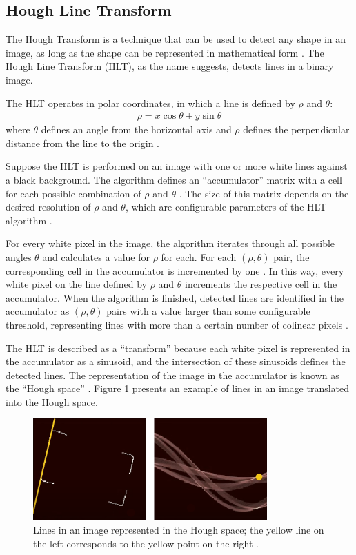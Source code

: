 \subsection{Hough Line Transform}

The Hough Transform is a technique that can be used to detect any shape in an image, as long as the shape can be represented in mathematical form \cite{opencv_hlt}. The Hough Line Transform (HLT), as the name suggests, detects lines in a binary image.

The HLT operates in polar coordinates, in which a line is defined by $\rho$ and $\theta$:
\begin{align}
  \rho = x \cos\theta + y \sin\theta
\end{align}
where $\theta$ defines an angle from the horizontal axis and $\rho$ defines the perpendicular distance from the line to the origin \cite{opencv_hlt}.

Suppose the HLT is performed on an image with one or more white lines against a black background. The algorithm defines an ``accumulator'' matrix with a cell for each possible combination of $\rho$ and $\theta$ \cite{opencv_hlt}. The size of this matrix depends on the desired resolution of $\rho$ and $\theta$, which are configurable parameters of the HLT algorithm \cite{opencv_hlt}.

For every white pixel in the image, the algorithm iterates through all possible angles $\theta$ and calculates a value for $\rho$ for each. For each $(\rho,\theta)$ pair, the corresponding cell in the accumulator is incremented by one \cite{opencv_hlt}. In this way, every white pixel on the line defined by $\rho$ and $\theta$ increments the respective cell in the accumulator. When the algorithm is finished, detected lines are identified in the accumulator as $(\rho,\theta)$ pairs with a value larger than some configurable threshold, representing lines with more than a certain number of colinear pixels \cite{opencv_hlt}.

The HLT is described as a ``transform'' because each white pixel is represented in the accumulator as a sinusoid, and the intersection of these sinusoids defines the detected lines. The representation of the image in the accumulator is known as the ``Hough space'' \cite{opencv_hlt}. Figure \ref{fig:hough_line} presents an example of lines in an image translated into the Hough space.

\begin{figure}[ht]
  \centering
  \includegraphics[width=0.8\textwidth]{images/hough_transform.png}
  \caption{Lines in an image represented in the Hough space; the yellow line on the left corresponds to the yellow point on the right \cite{korting_hlt}.}
  \label{fig:hough_line}
\end{figure}

